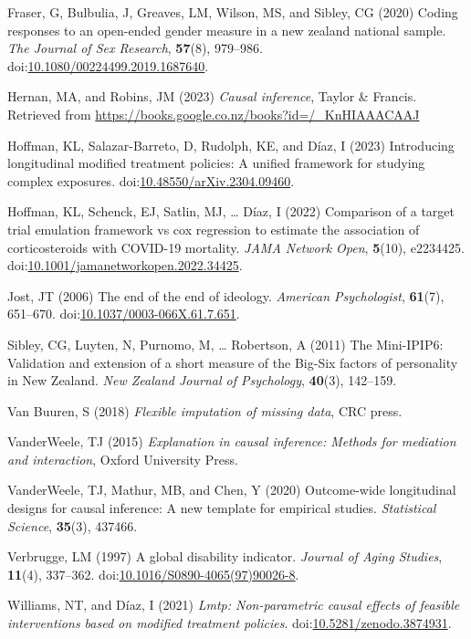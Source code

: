 \documentclass[
  singlecolumn]{article}
\newlength{\cslhangindent}
\newenvironment{CSLReferences}[2] %
 {\begin{list}{}{%
  \setlength{\itemindent}{0pt}
  \setlength{\leftmargin}{0pt}
  \setlength{\parsep}{0pt}
  \ifodd #1
   \setlength{\leftmargin}{\cslhangindent}
   \setlength{\itemindent}{-1\cslhangindent}
  \fi
  \setlength{\itemsep}{#2\baselineskip}}}
 {\end{list}}
\begin{document}
\begin{CSLReferences}{1}{0}
Fraser, G, Bulbulia, J, Greaves, LM, Wilson, MS, and Sibley, CG (2020)
Coding responses to an open-ended gender measure in a new zealand
national sample. \emph{The Journal of Sex Research}, \textbf{57}(8),
979--986.
doi:\href{https://doi.org/10.1080/00224499.2019.1687640}{10.1080/00224499.2019.1687640}.

Hernan, MA, and Robins, JM (2023) \emph{Causal inference}, Taylor \&
Francis. Retrieved from
\url{https://books.google.co.nz/books?id=/_KnHIAAACAAJ}

Hoffman, KL, Salazar-Barreto, D, Rudolph, KE, and Díaz, I (2023)
Introducing longitudinal modified treatment policies: A unified
framework for studying complex exposures.
doi:\href{https://doi.org/10.48550/arXiv.2304.09460}{10.48550/arXiv.2304.09460}.

Hoffman, KL, Schenck, EJ, Satlin, MJ, \ldots{} Díaz, I (2022) Comparison
of a target trial emulation framework vs cox regression to estimate the
association of corticosteroids with COVID-19 mortality. \emph{JAMA
Network Open}, \textbf{5}(10), e2234425.
doi:\href{https://doi.org/10.1001/jamanetworkopen.2022.34425}{10.1001/jamanetworkopen.2022.34425}.

Jost, JT (2006) The end of the end of ideology. \emph{American
Psychologist}, \textbf{61}(7), 651--670.
doi:\href{https://doi.org/10.1037/0003-066X.61.7.651}{10.1037/0003-066X.61.7.651}.

Sibley, CG, Luyten, N, Purnomo, M, \ldots{} Robertson, A (2011) The
Mini-IPIP6: Validation and extension of a short measure of the Big-Six
factors of personality in New Zealand. \emph{New Zealand Journal of
Psychology}, \textbf{40}(3), 142--159.

Van Buuren, S (2018) \emph{Flexible imputation of missing data}, CRC
press.

VanderWeele, TJ (2015) \emph{Explanation in causal inference: Methods
for mediation and interaction}, Oxford University Press.

VanderWeele, TJ, Mathur, MB, and Chen, Y (2020) Outcome-wide
longitudinal designs for causal inference: A new template for empirical
studies. \emph{Statistical Science}, \textbf{35}(3), 437466.

Verbrugge, LM (1997) A global disability indicator. \emph{Journal of
Aging Studies}, \textbf{11}(4), 337--362.
doi:\href{https://doi.org/10.1016/S0890-4065(97)90026-8}{10.1016/S0890-4065(97)90026-8}.

Williams, NT, and Díaz, I (2021) \emph{Lmtp: Non-parametric causal
effects of feasible interventions based on modified treatment policies}.
doi:\href{https://doi.org/10.5281/zenodo.3874931}{10.5281/zenodo.3874931}.

\end{CSLReferences}
\end{document}
